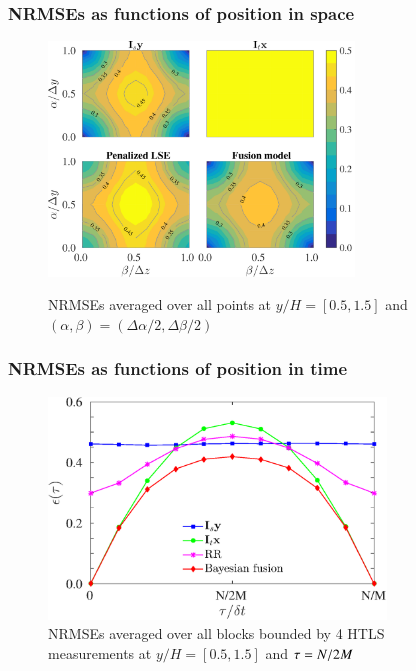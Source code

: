 \documentclass{beamer}
\begin{document}
\begin{frame}
\frametitle{NRMSEs as functions of position in space}
	\begin{figure}
		\includegraphics[width=0.725\textwidth]{./figures/comparisons/channel/error_MAP_newOM1_boxin4HWs_outer.png}\
		\caption*{NRMSEs averaged over all points at $ y/H=[0.5,1.5] $ and $ (\alpha,\beta) = (\Delta \alpha/2,\Delta \beta/2) $}		
	\end{figure}
\end{frame}

\begin{frame}
\frametitle{NRMSEs as functions of position in time}
	\begin{figure}
		\includegraphics[width=0.8\textwidth]{./figures/comparisons/channel/error_MAP_newOM1_middlepoint_outer.eps}
		\caption*{NRMSEs averaged over all blocks bounded by 4 HTLS measurements at $ y/H=[0.5,1.5] $ and $ \tau = N/2M $}
	\end{figure}
\end{frame}
\end{document}
